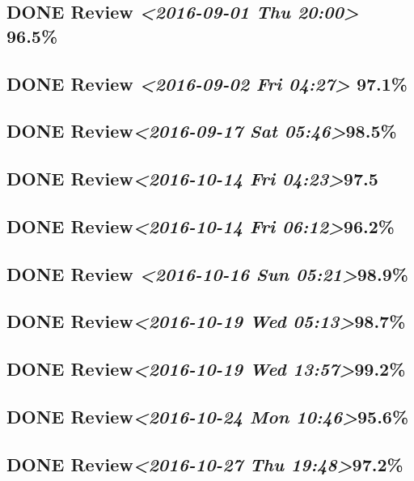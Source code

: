 \documentclass[11pt]{ctexart}
\begin{document}
\subsection{{\bfseries\sffamily DONE} Review \textit{<2016-09-01 Thu 20:00> } 96.5\%}
\label{sec:org19d05ec}
\subsection{{\bfseries\sffamily DONE} Review \textit{<2016-09-02 Fri 04:27> } 97.1\%}
\label{sec:org0e6808b}
\subsection{{\bfseries\sffamily DONE} Review\textit{<2016-09-17 Sat 05:46>}98.5\%}
\label{sec:org70d6dc4}

\subsection{{\bfseries\sffamily DONE} Review\textit{<2016-10-14 Fri 04:23>}97.5}
\label{sec:org8019caf}
\subsection{{\bfseries\sffamily DONE} Review\textit{<2016-10-14 Fri 06:12>}96.2\%}
\label{sec:org68baf5e}
\subsection{{\bfseries\sffamily DONE} Review \textit{<2016-10-16 Sun 05:21>}98.9\%}
\label{sec:org14edc88}
\subsection{{\bfseries\sffamily DONE} Review\textit{<2016-10-19 Wed 05:13>}98.7\%}
\label{sec:orgd207260}
\subsection{{\bfseries\sffamily DONE} Review\textit{<2016-10-19 Wed 13:57>}99.2\%}
\label{sec:orgf21ab6e}
\subsection{{\bfseries\sffamily DONE} Review\textit{<2016-10-24 Mon 10:46>}95.6\%}
\label{sec:org389cd42}
\subsection{{\bfseries\sffamily DONE} Review\textit{<2016-10-27 Thu 19:48>}97.2\%}
\label{sec:org17b9d22}
\end{document}
